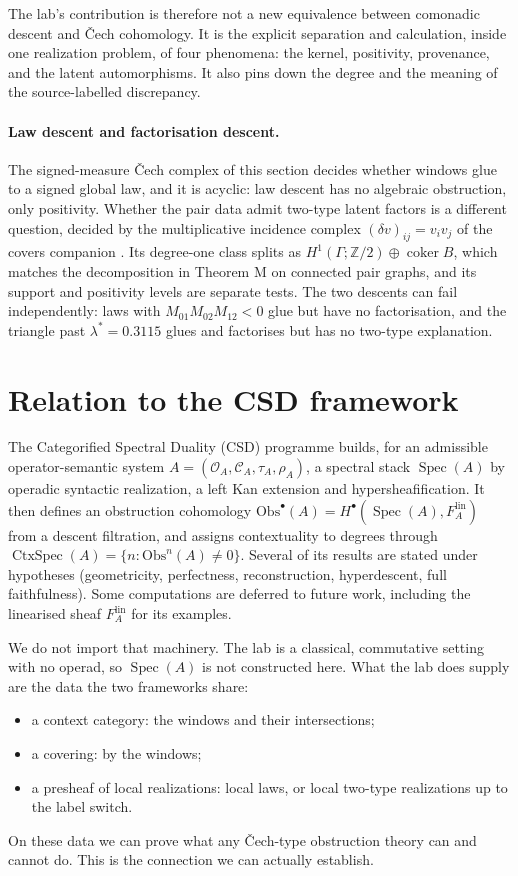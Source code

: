 \documentclass[11pt]{article}
\theoremstyle{definition}\newtheorem{definition}{Definition}\newtheorem{remark}{Remark}
\begin{document}
The lab's contribution is therefore not a new equivalence between comonadic descent and Čech cohomology. It is the explicit separation
and calculation, inside one realization problem, of four phenomena: the kernel, positivity, provenance, and the latent automorphisms. It
also pins down the degree and the meaning of the source-labelled discrepancy.

\paragraph{Law descent and factorisation descent.} The signed-measure \v{C}ech complex of this section decides whether windows glue
to a signed global law, and it is acyclic: law descent has no algebraic obstruction, only positivity. Whether the pair data admit
two-type latent factors is a different question, decided by the multiplicative incidence complex
$(\delta v)_{ij}=v_iv_j$ of the covers companion \cite[Section ``Stratified descent'']{CoversCompanion}. Its degree-one class splits as
$H^1(\Gamma;\mathbb Z/2)\oplus\operatorname{coker}B$, which matches the decomposition in Theorem M on connected pair graphs, and its
support and positivity levels are separate tests. The two descents can fail independently: laws with $M_{01}M_{02}M_{12}<0$ glue but
have no factorisation, and the triangle past $\lambda^*=0.3115$ glues and factorises but has no two-type explanation.

\section{Relation to the CSD framework}\label{sec:csd}
The Categorified Spectral Duality (CSD) programme \cite{ChangCSD2026} builds, for an admissible operator-semantic system
$A=(\mathcal O_A,\mathcal C_A,\tau_A,\rho_A)$, a spectral stack $\operatorname{Spec}(A)$ by operadic syntactic realization, a left Kan
extension and hypersheafification. It then defines an obstruction cohomology $\mathrm{Obs}^\bullet(A)=H^\bullet(\operatorname{Spec}(A),F^{\mathrm{lin}}_A)$
from a descent filtration, and assigns contextuality to degrees through $\operatorname{CtxSpec}(A)=\{n:\mathrm{Obs}^n(A)\ne0\}$.
Several of its results are stated under hypotheses (geometricity, perfectness, reconstruction, hyperdescent, full faithfulness). Some
computations are deferred to future work, including the linearised sheaf $F^{\mathrm{lin}}_A$ for its examples.

We do not import that machinery. The lab is a classical, commutative setting with no operad, so $\operatorname{Spec}(A)$ is not
constructed here. What the lab does supply are the data the two frameworks share:
\begin{itemize}
\item a context category: the windows and their intersections;
\item a covering: by the windows;
\item a presheaf of local realizations: local laws, or local two-type realizations up to the label switch.
\end{itemize}
On these data we can prove what any Čech-type obstruction theory can and cannot do. This is the connection we can actually establish.
\end{document}

